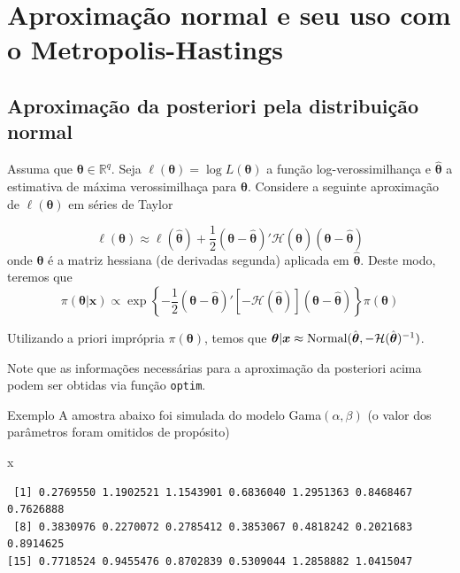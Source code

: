 \documentclass[
  letterpaper,
  DIV=11,
  numbers=noendperiod]{scrreprt}
\newenvironment{Shaded}{\begin{snugshade}}{\end{snugshade}}
\newcommand{\NormalTok}[1]{\textcolor[rgb]{0.00,0.23,0.31}{#1}}
\theoremstyle{definition}
\theoremstyle{plain}
\theoremstyle{definition}
\theoremstyle{remark}
\begin{document}
\chapter{Aproximação normal e seu uso com o
Metropolis-Hastings}\label{aproximauxe7uxe3o-normal-e-seu-uso-com-o-metropolis-hastings}

\section{Aproximação da posteriori pela distribuição
normal}\label{aproximauxe7uxe3o-da-posteriori-pela-distribuiuxe7uxe3o-normal}

Assuma que \(\boldsymbol{\theta}\in\mathbb{R}^q\). Seja
\(\ell(\boldsymbol{\theta})=\log L(\boldsymbol{\theta})\) a função
log-verossimilhança e \(\hat{\boldsymbol{\theta}}\) a estimativa de
máxima verossimilhaça para \(\boldsymbol{\theta}\). Considere a seguinte
aproximação de \(\ell(\boldsymbol{\theta})\) em séries de Taylor

\[\ell(\boldsymbol{\theta})\approx  \ell(\hat{\boldsymbol{\theta}})+\frac{1}{2}(\boldsymbol{\theta}-\hat{\boldsymbol{\theta}})'\mathcal{H}(\hat{\boldsymbol{\theta}})(\boldsymbol{\theta}-\hat{\boldsymbol{\theta}})\]
onde \(\boldsymbol{\theta}\) é a matriz hessiana (de derivadas segunda)
aplicada em \(\hat{\boldsymbol{\theta}}\). Deste modo, teremos que
\[\pi(\boldsymbol{\theta}|\boldsymbol{x})\propto \exp\left\{-\frac{1}{2}(\boldsymbol{\theta}-\hat{\boldsymbol{\theta}})'\left[-\mathcal{H}(\hat{\boldsymbol{\theta}})\right](\boldsymbol{\theta}-\hat{\boldsymbol{\theta}})\right\}\pi(\boldsymbol{\theta})\]

Utilizando a priori imprópria \(\pi(\boldsymbol{\theta})\), temos que
\(\boldsymbol{\theta}|\boldsymbol{x}\approx \hbox{Normal}(\hat{\boldsymbol{\theta}},-\mathcal{H}(\hat{\boldsymbol{\theta}})^{-1})\).

Note que as informações necessárias para a aproximação da posteriori
acima podem ser obtidas via função \texttt{optim}.

Exemplo A amostra abaixo foi simulada do modelo Gama\((\alpha,\beta)\)
(o valor dos parâmetros foram omitidos de propósito)

\begin{Shaded}
\begin{Highlighting}[]
\NormalTok{x}
\end{Highlighting}
\end{Shaded}

\begin{verbatim}
 [1] 0.2769550 1.1902521 1.1543901 0.6836040 1.2951363 0.8468467 0.7626888
 [8] 0.3830976 0.2270072 0.2785412 0.3853067 0.4818242 0.2021683 0.8914625
[15] 0.7718524 0.9455476 0.8702839 0.5309044 1.2858882 1.0415047
\end{verbatim}
\end{document}
